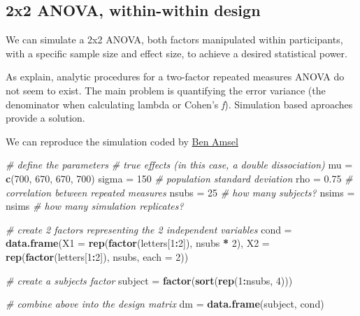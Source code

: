 \documentclass[]{book}
\newenvironment{Shaded}{\begin{snugshade}}{\end{snugshade}}
\newcommand{\CommentTok}[1]{\textcolor[rgb]{0.56,0.35,0.01}{\textit{#1}}}
\newcommand{\DataTypeTok}[1]{\textcolor[rgb]{0.13,0.29,0.53}{#1}}
\newcommand{\DecValTok}[1]{\textcolor[rgb]{0.00,0.00,0.81}{#1}}
\newcommand{\FloatTok}[1]{\textcolor[rgb]{0.00,0.00,0.81}{#1}}
\newcommand{\KeywordTok}[1]{\textcolor[rgb]{0.13,0.29,0.53}{\textbf{#1}}}
\newcommand{\NormalTok}[1]{#1}
\newcommand{\OperatorTok}[1]{\textcolor[rgb]{0.81,0.36,0.00}{\textbf{#1}}}
\newcommand{\StringTok}[1]{\textcolor[rgb]{0.31,0.60,0.02}{#1}}
\begin{document}
\hypertarget{x2-anova-within-within-design}{%
\subsection{2x2 ANOVA, within-within design}\label{x2-anova-within-within-design}}

We can simulate a 2x2 ANOVA, both factors manipulated within participants, with a specific sample size and effect size, to achieve a desired statistical power.

As \citet{potvin2000statistical} explain, analytic procedures for a two-factor repeated measures ANOVA do not seem to exist. The main problem is quantifying the error variance (the denominator when calculating lambda or Cohen's \emph{f}). Simulation based aproaches provide a solution.

We can reproduce the simulation coded by \href{https://cognitivedatascientist.com/2015/12/14/power-simulation-in-r-the-repeated-measures-anova-5/}{Ben Amsel}

\begin{Shaded}
\begin{Highlighting}[]
\CommentTok{# define the parameters}
\CommentTok{# true effects (in this case, a double dissociation)}
\NormalTok{mu =}\StringTok{ }\KeywordTok{c}\NormalTok{(}\DecValTok{700}\NormalTok{, }\DecValTok{670}\NormalTok{, }\DecValTok{670}\NormalTok{, }\DecValTok{700}\NormalTok{) }
\NormalTok{sigma =}\StringTok{ }\DecValTok{150}  \CommentTok{# population standard deviation}
\NormalTok{rho =}\StringTok{ }\FloatTok{0.75} \CommentTok{# correlation between repeated measures}
\NormalTok{nsubs =}\StringTok{ }\DecValTok{25} \CommentTok{# how many subjects?}
\NormalTok{nsims =}\StringTok{ }\NormalTok{nsims }\CommentTok{# how many simulation replicates?}
 
\CommentTok{# create 2 factors representing the 2 independent variables}
\NormalTok{cond =}\StringTok{ }\KeywordTok{data.frame}\NormalTok{(}\DataTypeTok{X1 =} \KeywordTok{rep}\NormalTok{(}\KeywordTok{factor}\NormalTok{(letters[}\DecValTok{1}\OperatorTok{:}\DecValTok{2}\NormalTok{]), nsubs }\OperatorTok{*}\StringTok{ }\DecValTok{2}\NormalTok{),}
                  \DataTypeTok{X2 =} \KeywordTok{rep}\NormalTok{(}\KeywordTok{factor}\NormalTok{(letters[}\DecValTok{1}\OperatorTok{:}\DecValTok{2}\NormalTok{]), nsubs, }\DataTypeTok{each =} \DecValTok{2}\NormalTok{))}
 
\CommentTok{# create a subjects factor}
\NormalTok{subject =}\StringTok{ }\KeywordTok{factor}\NormalTok{(}\KeywordTok{sort}\NormalTok{(}\KeywordTok{rep}\NormalTok{(}\DecValTok{1}\OperatorTok{:}\NormalTok{nsubs, }\DecValTok{4}\NormalTok{)))}
 
\CommentTok{# combine above into the design matrix}
\NormalTok{dm =}\StringTok{ }\KeywordTok{data.frame}\NormalTok{(subject, cond)}
\end{Highlighting}
\end{Shaded}
\end{document}
